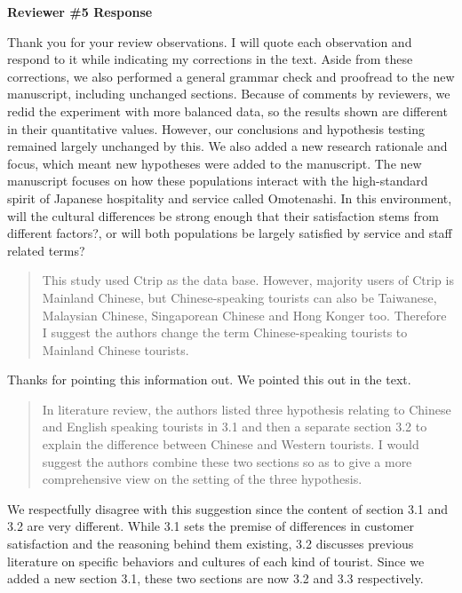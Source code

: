 \documentclass{letter}
\begin{document}

\textbf{Reviewer \#5 Response}


Thank you for your review observations. I will quote each observation and respond to it while indicating my corrections in the text.
Aside from these corrections, we also performed a general grammar check and proofread to the new manuscript, including unchanged sections. Because of comments by reviewers, we redid the experiment with more balanced data, so the results shown are different in their quantitative values. However, our conclusions and hypothesis testing remained largely unchanged by this. We also added a new research rationale and focus, which meant new hypotheses were added to the manuscript. The new manuscript focuses on how these populations interact with the high-standard spirit of Japanese hospitality and service called Omotenashi. In this environment, will the cultural differences be strong enough that their satisfaction stems from different factors?, or will both populations be largely satisfied by service and staff related terms?


\begin{quotation}
This study used Ctrip as the data base. However, majority users of Ctrip is Mainland Chinese, but Chinese-speaking tourists can also be Taiwanese, Malaysian Chinese, Singaporean Chinese and Hong Konger too. Therefore I suggest the authors change the term Chinese-speaking tourists to Mainland Chinese tourists.
\end{quotation}

Thanks for pointing this information out. We pointed this out in the text.


\begin{quotation}
In literature review, the authors listed three hypothesis relating to Chinese and English speaking tourists in 3.1 and then a separate section 3.2 to explain the difference between Chinese and Western tourists. I would suggest the authors combine these two sections so as to give a more comprehensive view on the setting of the three hypothesis.
\end{quotation}

We respectfully disagree with this suggestion since the content of section 3.1 and 3.2 are very different. While 3.1 sets the premise of differences in customer satisfaction and the reasoning behind them existing, 3.2 discusses previous literature on specific behaviors and cultures of each kind of tourist. Since we added a new section 3.1, these two sections are now 3.2 and 3.3 respectively.
\end{document}
